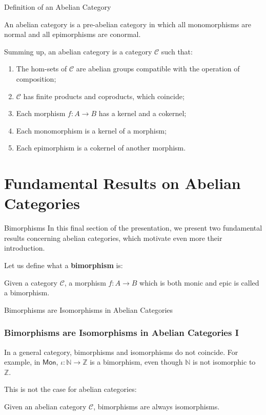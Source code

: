 \documentclass{beamer}
\newcommand{\NN}{\mathbb{N}}
\newcommand{\ZZ}{\mathbb{Z}}
\newcommand{\cat}[1]{\mathsf{#1}}
\begin{document}
\begin{frame}{Definition of an Abelian Category}
    \begin{definition}
        An abelian category is a pre-abelian category in which all monomorphisms are normal
        and all epimorphisms are conormal.
    \end{definition}

    Summing up, an abelian category is a category $\mathcal{C}$ such that:
    \begin{enumerate}
        \item The hom-sets of $\mathcal{C}$ are abelian groups compatible with the
            operation of composition;
        \item $\mathcal{C}$ has finite products and coproducts, which coincide;
        \item Each morphism $f : A \to B$ has a kernel and a cokernel;
        \item Each monomorphism is a kernel of a morphism;
        \item Each epimorphism is a cokernel of another morphism.
    \end{enumerate}
\end{frame}


\section{Fundamental Results on Abelian Categories}

\begin{frame}{Bimorphisms}
    In this final section of the presentation, we present
    two fundamental results concerning abelian categories, which
    motivate even more their introduction. \medskip
    
    Let us define what a \textbf{bimorphism} is:

    \begin{definition}[Bimorphism]
        Given a category $\mathcal{C}$, a morphism
        $f : A \to B$ which is both monic and epic is
        called a bimorphism. 
    \end{definition}
\end{frame}

\begin{frame}{Bimorphisms are Isomorphisms in Abelian Categories}
    \frametitle{Bimorphisms are Isomorphisms in Abelian Categories I}

    In a general category, bimorphisms and isomorphisms do not
    coincide. For example, in $\cat{Mon}$, $\iota : \NN \to \ZZ$
    is a bimorphism, even though $\NN$ is not isomorphic to $\ZZ$. \medskip

    This is not the case for abelian categories:
    \begin{theorem}
        Given an abelian category $\mathcal{C}$, bimorphisms are
        always isomorphisms.
    \end{theorem}
\end{frame}
\end{document}
